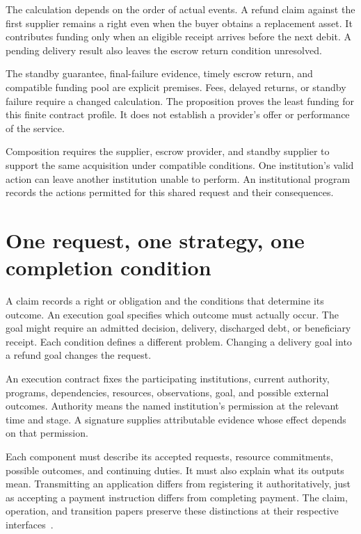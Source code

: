 \documentclass{momentum}
\begin{document}
The calculation depends on the order of actual events.
A refund claim against the first supplier remains a right even when the buyer obtains a replacement asset.
It contributes funding only when an eligible receipt arrives before the next debit.
A pending delivery result also leaves the escrow return condition unresolved.

The standby guarantee, final-failure evidence, timely escrow return, and compatible funding pool are explicit premises.
Fees, delayed returns, or standby failure require a changed calculation.
The proposition proves the least funding for this finite contract profile.
It does not establish a provider's offer or performance of the service.

Composition requires the supplier, escrow provider, and standby supplier to support the same acquisition under compatible conditions.
One institution's valid action can leave another institution unable to perform.
An institutional program records the actions permitted for this shared request and their consequences.

\section{One request, one strategy, one completion condition}
\label{sec:contract}

A claim records a right or obligation and the conditions that determine its outcome.
An execution goal specifies which outcome must actually occur.
The goal might require an admitted decision, delivery, discharged debt, or beneficiary receipt.
Each condition defines a different problem.
Changing a delivery goal into a refund goal changes the request.

An execution contract fixes the participating institutions, current authority, programs, dependencies, resources, observations, goal, and possible external outcomes.
Authority means the named institution's permission at the relevant time and stage.
A signature supplies attributable evidence whose effect depends on that permission.

Each component must describe its accepted requests, resource commitments, possible outcomes, and continuing duties.
It must also explain what its outputs mean.
Transmitting an application differs from registering it authoritatively, just as accepting a payment instruction differs from completing payment.
The claim, operation, and transition papers preserve these distinctions at their respective interfaces~\cite{claim,op,transitions}.
\end{document}
